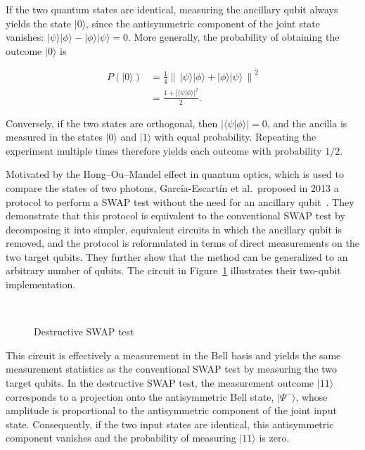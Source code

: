 If the two quantum states are identical, measuring the ancillary qubit always yields the state \(|0\rangle\), since the antisymmetric component of the joint state vanishes: \(|\psi\rangle|\phi\rangle-|\phi\rangle|\psi\rangle=0\). More generally, the probability of obtaining the outcome \(|0\rangle\) is

\begin{equation}
\begin{aligned}
     P(|0\rangle)
     &=\frac{1}{4}\left\|\,|\psi\rangle|\phi\rangle+|\phi\rangle|\psi\rangle\,\right\|^2\\
     &=\frac{1+|\langle\psi|\phi\rangle|^2}{2}.
     \label{eq:swaptest_pass}
\end{aligned}
\end{equation}

Conversely, if the two states are orthogonal, then \(|\langle\psi|\phi\rangle|=0\), and the ancilla is measured in the states \(|0\rangle\) and \(|1\rangle\) with equal probability. Repeating the experiment multiple times therefore yields each outcome with probability \(1/2\).

Motivated by the Hong–Ou–Mandel effect in quantum optics, which is used to compare the states of two photons, García-Escartín et al.\ proposed in 2013 a protocol to perform a SWAP test without the need for an ancillary qubit~\cite{Garcia_Escartin_2013}. They demonstrate that this protocol is equivalent to the conventional SWAP test by decomposing it into simpler, equivalent circuits in which the ancillary qubit is removed, and the protocol is reformulated in terms of direct measurements on the two target qubits. They further show that the method can be generalized to an arbitrary number of qubits. The circuit in Figure~\ref{fig:destructive_swap} illustrates their two-qubit implementation.

\begin{figure}[h]
\centering
{}
\caption{Destructive SWAP test}
~\label{fig:destructive_swap}
\end{figure}

This circuit is effectively a measurement in the Bell basis and yields the same measurement statistics as the conventional SWAP test by measuring the two target qubits. In the destructive SWAP test, the measurement outcome \(|11\rangle\) corresponds to a projection onto the antisymmetric Bell state, \(|\Psi^-\rangle\), whose amplitude is proportional to the antisymmetric component of the joint input state. Consequently, if the two input states are identical, this antisymmetric component vanishes and the probability of measuring \(|11\rangle\) is zero.

